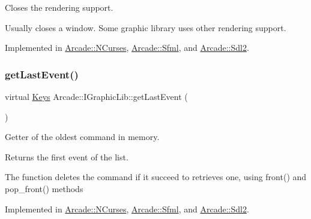 Closes the rendering support. 

Usually closes a window. Some graphic library uses other rendering support. 

Implemented in \hyperlink{class_arcade_1_1_n_curses_a1bbac59bdaa841d17439d01a06d9f5c3}{Arcade\+::\+N\+Curses}, \hyperlink{class_arcade_1_1_sfml_a3a2c22328c9ae1cfd7a5af03663e00d0}{Arcade\+::\+Sfml}, and \hyperlink{class_arcade_1_1_sdl2_a312397e628bbf14d8532e2a13575c7ab}{Arcade\+::\+Sdl2}.

\mbox{\label{class_arcade_1_1_i_graphic_lib_a801ebd3cff2c861e4b2a1e664c123da7}} 
\subsubsection{\texorpdfstring{get\+Last\+Event()}{getLastEvent()}}
{\footnotesize\ttfamily virtual \hyperlink{namespace_arcade_a9b501908b20bc993e4f8226db5323c41}{Keys} Arcade\+::\+I\+Graphic\+Lib\+::get\+Last\+Event (\begin{DoxyParamCaption}{ }\end{DoxyParamCaption})\hspace{0.3cm}{\ttfamily [pure virtual]}}



Getter of the oldest command in memory. 

\begin{DoxyReturn}{Returns}
the first event of the list.
\end{DoxyReturn}
The function deletes the command if it succeed to retrieves one, using front() and pop\+\_\+front() methods 

Implemented in \hyperlink{class_arcade_1_1_n_curses_a0c00b4aede0c9345f525fcb812fe8f78}{Arcade\+::\+N\+Curses}, \hyperlink{class_arcade_1_1_sfml_aa31ab4c4729ee0e3ff030989bc38237b}{Arcade\+::\+Sfml}, and \hyperlink{class_arcade_1_1_sdl2_a6d5bda09e7705c6ccef7451694621247}{Arcade\+::\+Sdl2}.

\mbox{\label{class_arcade_1_1_i_graphic_lib_a41a3c00970ecd16e1893105de2091a55}} 
